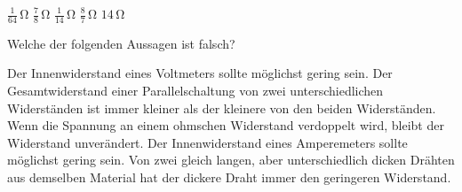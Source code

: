 \documentclass[11pt]{exam}
\begin{document}
\begin{questions}
\begin{choices}
	\choice \(\mathrm{\frac{1}{64}\,\Omega}\)
	\choice \(\mathrm{\frac{7}{8}\,\Omega}\)
	\choice \(\mathrm{\frac{1}{14}\,\Omega}\)
	\choice \(\mathrm{\frac{8}{7}\,\Omega}\)
	\choice \(\mathrm{14\,\Omega}\)
\end{choices}

\vspace{3mm}\question Welche der folgenden Aussagen ist falsch?

\begin{choices}
	\choice Der Innenwiderstand eines Voltmeters sollte möglichst gering sein.
	\choice Der Gesamtwiderstand einer Parallelschaltung von zwei unterschiedlichen Widerständen ist immer kleiner als der kleinere von den beiden Widerständen.
	\choice Wenn die Spannung an einem ohmschen Widerstand verdoppelt wird, bleibt der Widerstand unverändert.
	\choice Der Innenwiderstand eines Amperemeters sollte möglichst gering sein.
	\choice Von zwei gleich langen, aber unterschiedlich dicken Drähten aus demselben Material hat der dickere Draht immer den geringeren Widerstand.
\end{choices}

\vspace{3mm}\end{questions}
\end{document}
